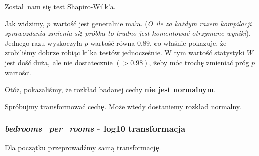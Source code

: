 \documentclass{article}
\begin{document}
\noindent
\quad Zosta\l\ nam si\c e test Shapiro-Wilk'a.

\begin{Schunk}
\end{Schunk}

\noindent
\quad Jak widzimy, $p$ wartoś\'c jest generalnie ma\l a. (\textit{O ile za każdym razem kompilacji sprawozdania zmienia si\c e próbka to trudno jest komentowa\'c otrzymane wyniki}). Jednego razu wyskoczy\l a $p$ wartoś\'c równa $0.89$, co w\l aśnie pokazuje, że zrobiliśmy dobrze robiąc kilka testów jednocześnie. W tym wartoś\'c statystyki $W$ jest doś\'c duża, ale nie dostatecznie $(> 0.98)$, żeby móc troch\c e zmienia\'c próg $p$ wartości.

\noindent
\quad Otóż, pokazaliśmy, że rozk\l ad badanej cechy \textbf{nie jest normalnym}.

\noindent
\quad Spróbujmy transformowa\'c cech\c e. Może wtedy dostaniemy rozk\l ad normalny.

\newpage
\subsubsection{\textit{bedrooms\_per\_rooms} - log10 transformacja}
\quad Dla początku przeprowadźmy samą transformacj\c e.
\end{document}
